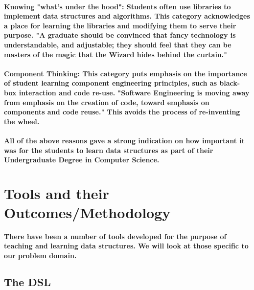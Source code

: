 \documentclass{article}
\begin{document}
\paragraph{Knowing "what's under the hood": Students often use libraries to implement data structures and algorithms. This category acknowledges a place for learning the libraries and modifying them to serve their purpose. "A graduate should be convinced that fancy technology is understandable, and adjustable; they should feel that they can be masters of the magic that the Wizard hides behind the curtain."}

\paragraph{Component Thinking: This category puts emphasis on the importance of student learning component engineering principles, such as black-box interaction and code re-use. "Software Engineering is moving away from emphasis on the creation of code, toward emphasis on components and code reuse." This avoids the process of re-inventing the wheel.}
\paragraph{All of the above reasons gave a strong indication on how important it was for the students to learn data structures as part of their Undergraduate Degree in Computer Science.}
\section{Tools and their Outcomes/Methodology}
\paragraph{There have been a number of tools developed for the purpose of teaching and learning data structures. We will look at those specific to our problem domain.}
\subsection{The DSL }
\end{document}
